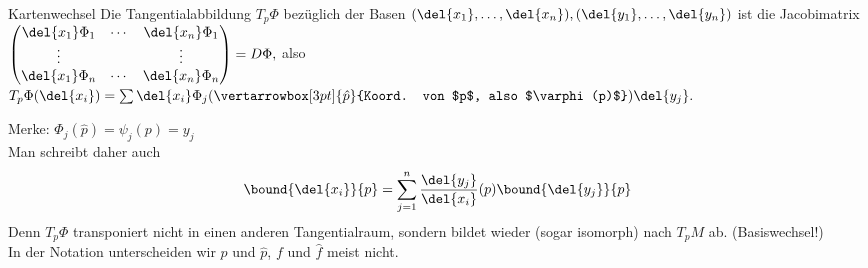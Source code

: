 \begin{rem}
	Kartenwechsel
	Die Tangentialabbildung $T_p\Phi$ bezüglich der Basen $ (\del{x_1},\dotsc, \del{x_n}),(\del{y_1},\dotsc,\del{y_n}) $ ist die Jacobimatrix $ \begin{pmatrix}
		\del{x_1} \Phi_1 & \cdots & \del{x_n}\Phi_1\\
		\vdots & &\vdots\\
		\del{x_1}\Phi_n & \cdots & \del{x_n}\Phi_n
	\end{pmatrix} = D\Phi, $ also $ T_p\Phi(\del{x_i}) = \sum \del{x_i}\Phi_j ({\vertarrowbox[3pt]{\hat{p}}{Koord. von $p$, also $\varphi(p)$}}) \del{y_j}. $
\end{rem}

Merke: $ \Phi_j(\hat{p}) = \psi_j(p) = y_j $\\
Man schreibt daher auch
\[ \bound{\del{x_i}}{p} = \sum_{j=1}^{n} \frac{\del{y_j}}{\del{x_i}}(p) \bound{\del{y_j}}{p} \]
Denn $T_p\Phi$ transponiert nicht in einen anderen Tangentialraum, sondern bildet wieder (sogar isomorph) nach $T_pM$ ab. (Basiswechsel!)\\
In der Notation unterscheiden wir $p$ und $\hat{p}$, $f$ und $\hat{f}$ meist nicht.

